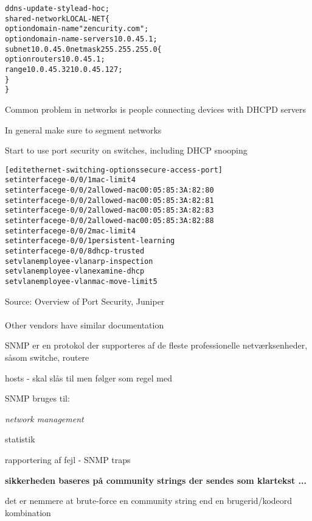 \documentclass[Screen16to9,17pt]{foils}
\begin{document}
\begin{alltt}
\small
ddns-update-style ad-hoc;
shared-network LOCAL-NET \{
    option  domain-name "zencurity.com";
    option  domain-name-servers 10.0.45.1;
    subnet 10.0.45.0 netmask 255.255.255.0 \{
            option routers 10.0.45.1;
            range 10.0.45.32 10.0.45.127;
    \}
\}
\end{alltt}


\begin{list1}
\item Common problem in networks is people connecting devices with DHCPD servers
\item In general make sure to segment networks
\item Start to use port security on switches, including DHCP snooping\\
\end{list1}


\begin{alltt}\small
[edit ethernet-switching-options secure-access-port]
set interface ge-0/0/1 mac-limit 4
set interface ge-0/0/2 allowed-mac 00:05:85:3A:82:80
set interface ge-0/0/2 allowed-mac 00:05:85:3A:82:81
set interface ge-0/0/2 allowed-mac 00:05:85:3A:82:83
set interface ge-0/0/2 allowed-mac 00:05:85:3A:82:88
set interface ge-0/0/2 mac-limit 4
set interface ge-0/0/1 persistent-learning
set interface ge-0/0/8 dhcp-trusted
set vlan employee-vlan arp-inspection
set vlan employee-vlan examine-dhcp
set vlan employee-vlan mac-move-limit 5
\end{alltt}

Source: Overview of Port Security, Juniper\\ {\small{}}\\
Other vendors have similar documentation



\begin{list1}
\item SNMP er en protokol der supporteres af de fleste professionelle
  netværksenheder, såsom switche, routere
\item hosts - skal slås til men følger som regel med
\item SNMP bruges til:
  \begin{list2}
    \item \emph{network management}
    \item statistik
    \item rapportering af fejl - SNMP traps
  \end{list2}
\item {\bfseries sikkerheden baseres på community strings der sendes
    som klartekst ...}
\item det er nemmere at brute-force en community string end en
  brugerid/kodeord kombination
\end{list1}
\end{document}
